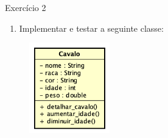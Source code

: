 \documentclass{beamer}
\begin{document}
\begin{frame}{Exercício 2}
    \begin{enumerate}
        \item Implementar e testar a seguinte classe:
    \end{enumerate}
    \begin{figure}[H]
        \includegraphics[width=3.5cm]{Theme/Logos/classe_cavalo.png}
    \end{figure}
\end{frame}
\end{document}
